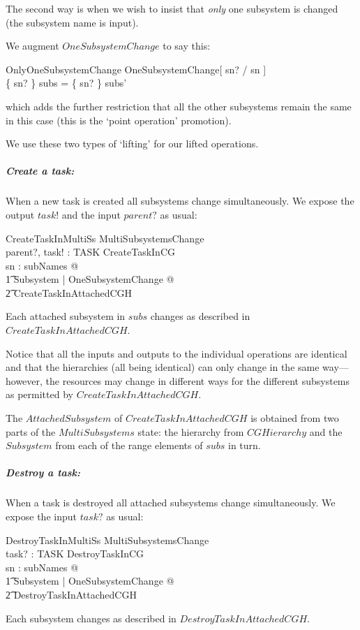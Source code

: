 \documentclass[a4paper,twoside,12pt]{article}
\begin{document}
The second way is when we wish to insist that \emph{only} one subsystem is changed (the subsystem name is input).

We augment
$OneSubsystemChange$ to say this:
\begin{schema}{OnlyOneSubsystemChange}
OneSubsystemChange[ sn? / sn ] \\
\where
\{ sn? \} \ndres subs = \{ sn? \} \ndres subs' \\
\end{schema}
which adds the further restriction that all the other subsystems remain the same in this case (this is the `point
operation' promotion).

We use these two types of `lifting' for our lifted operations.

\subparagraph{Create a task:}

When a new task is created all subsystems change simultaneously. We expose the output $task!$ and the input $parent?$ as usual:

\begin{schema}{CreateTaskInMultiSs}
MultiSubsystemsChange \\
parent?, task! : TASK
\where
CreateTaskInCG \\
\forall sn : subNames @ \\
\t1 \exists \Delta Subsystem | OneSubsystemChange @ \\
    \t2 CreateTaskInAttachedCGH
\end{schema}
Each attached subsystem in $subs$ changes as described in $CreateTaskInAttachedCGH$.

Notice that all the inputs and outputs to the individual operations are identical and that the hierarchies 
(all being identical)
can only change in the same way---however, the resources may change in different ways for the different subsystems as permitted by
$CreateTaskInAttachedCGH$.

The $AttachedSubsystem$ of $CreateTaskInAttachedCGH$ is obtained from two parts of the
$MultiSubsystems$ state: the hierarchy from $CGHierarchy$ and the $Subsystem$ from each of the
range elements of $subs$ in turn.

\subparagraph{Destroy a task:}

When a task is destroyed all attached subsystems change simultaneously. We expose the input $task?$ as usual:
\begin{schema}{DestroyTaskInMultiSs}
MultiSubsystemsChange \\
task? : TASK
\where
DestroyTaskInCG\\
\forall sn : subNames @ \\
\t1 \exists \Delta Subsystem | OneSubsystemChange @ \\
    \t2 DestroyTaskInAttachedCGH
\end{schema}
Each subsystem changes as described in $DestroyTaskInAttachedCGH$.
\end{document}
